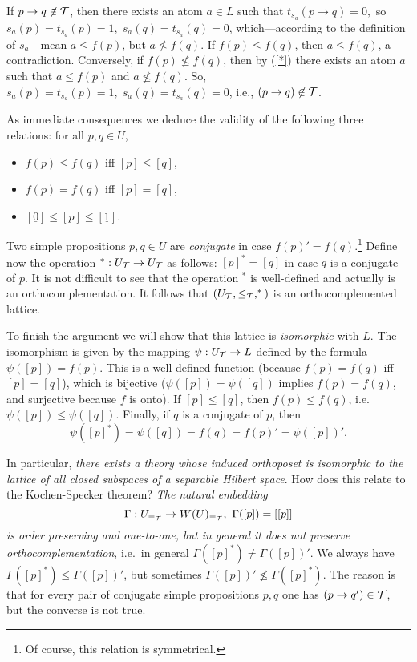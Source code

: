 If $p \rightarrow q\not\in {\cal T}$, then there exists an atom $a\in L$
such that
$t_{s_a}(p \rightarrow q)=0,$ so $s_a(p) = t_{s_a}(p)=1, \;s_a(q) =
t_{s_a}(q)=0$, which---according to the definition of $s_a$---mean
$a\leq f(p)$, but $a\not\leq f(q)$. If $f(p) \leq f(q)$, then
$a\leq f(q)$, a contradiction.  Conversely, if $f(p) \not\leq f(q)$, then
by (\ref{*}) there
exists an atom $a$ such that $a\leq f(p)$ and $a\not\leq f(q)$. So, $s_a(p)
= t_{s_a}(p)=1,
\;s_a(q) = t_{s_a}(q)=0$, i.e., $(p\rightarrow q)\not\in {\cal T}$.

As immediate consequences we deduce the validity of the following three
relations: for all
$p,q\in U$,
\begin{itemize}
\item  $ f(p) \leq f(q)$ iff  $[p]\leq [q]$,
\item $ f(p) = f(q)$ iff  $[p] = [q]$,
\item  $[\underline{0}] \leq [p] \leq [\underline{1}]$.
\end{itemize}

Two simple propositions $p,q\in U$ are {\it conjugate} in case
$f(p)'=f(q)$.\footnote{Of course,
this relation is symmetrical.} Define now the operation $^{*}: U_{{\cal T}}
\rightarrow U_{{\cal
T}}$ as follows: $[p]^{*}=[q]$ in case $q$ is a conjugate of $p$.  It is
not difficult to see that
the operation $^{*}$ is well-defined and actually is an
orthocomplementation. It follows that
$(U_{{\cal T}}, \leq_{{\cal T}}, ^{*})$ is an orthocomplemented lattice.

To finish the argument we will show that this lattice is {\it isomorphic}
with $L$. The
isomorphism is given by the mapping $\psi : U_{{\cal T}} \rightarrow L$
defined by
the formula $\psi([p]) =  f(p)$. This is a well-defined function
(because $ f(p) = f(q)$ iff  $[p]=[q]$), which is bijective ($\psi([p])=
\psi([q])$
implies $ f(p) = f(q)$, and surjective because $f$ is onto). If $[p]\leq [q]$,
then $f(p)\leq f(q)$, i.e. $\psi([p]) \leq \psi([q])$. Finally, if
$q$ is a conjugate
of $p$, then
\[\psi([p]^{*}) = \psi([q]) = f(q) = f(p)'= \psi([p])'.\]

In particular, {\it there exists a theory
whose induced
orthoposet is isomorphic to the lattice of all closed subspaces of
a separable Hilbert
space}. How does this relate to the Kochen-Specker theorem?
{\it The natural embedding
\[ \Gamma: U_{\equiv_{{\cal T}}} \rightarrow W(U)_{\equiv_{{\cal T}}}, \
\Gamma ([p]) = [[p]]\]
is order preserving and one-to-one, but in general it does not preserve
orthocomplementation}, i.e.\ in general
$\Gamma ([p]^{*}) \neq \Gamma ([p])'$. We always have $\Gamma ([p]^{*}) \leq
\Gamma ([p])'$, but sometimes $
\Gamma ([p])'\not\leq \Gamma ([p]^{*})$.
The reason is that for every pair of conjugate simple propositions $p,q$
one has $(p \rightarrow q')\in {\cal T}$, but the converse is not true.

